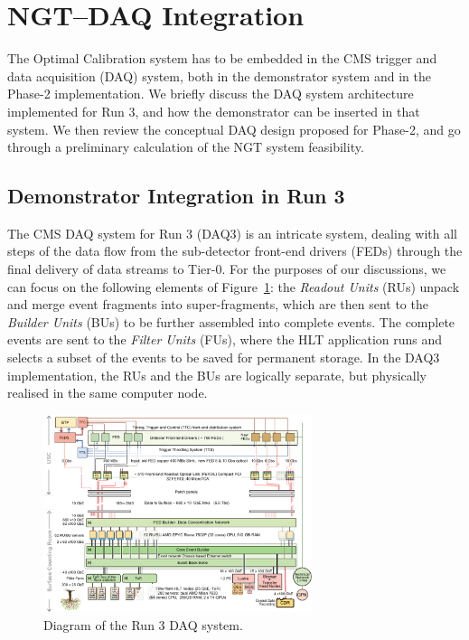 \section{NGT--DAQ Integration} %


The Optimal Calibration system has to be embedded in the CMS trigger and data acquisition (DAQ) system,
both in the demonstrator system and in the Phase-2 implementation.
We briefly discuss the DAQ system architecture implemented for Run 3, 
and how the demonstrator can be inserted in that system.
We then review the conceptual DAQ design proposed for Phase-2, and 
go through a preliminary calculation of the NGT system feasibility.

\subsection{Demonstrator Integration in Run 3}

The CMS DAQ system for Run 3 (DAQ3) is an intricate system, dealing with all steps of the data flow from the sub-detector front-end drivers (FEDs) through the final delivery of data streams to Tier-0. For the purposes of our discussions, we can focus on the following elements of Figure~\ref{fig:DAQ3}: 
the \emph{Readout Units} (RUs) unpack and merge event fragments into super-fragments, which are then sent to the \emph{Builder Units} (BUs) to be further assembled into complete events. 
The complete events are sent to the \emph{Filter Units} (FUs), where the HLT application runs and selects a subset of the events to be saved for permanent storage. 
In the DAQ3 implementation, the RUs and the BUs are logically separate, but physically realised in the same computer node.
\begin{figure}[htbp]
   \centering
	\includegraphics[width=0.7\textwidth]{figures/DAQRun3.pdf}
  \caption{Diagram of the Run 3 DAQ system.}
   \label{fig:DAQ3}
\end{figure}

